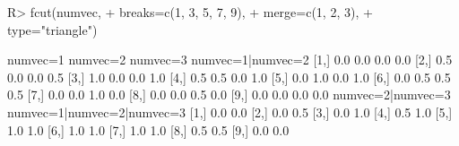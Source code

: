 \begin{Schunk}
% --begin: "fcut.merge2"
\begin{Sinput}
R> fcut(numvec,
+       breaks=c(1, 3, 5, 7, 9),
+       merge=c(1, 2, 3),
+       type="triangle")
\end{Sinput}
\begin{Soutput}
      numvec=1 numvec=2 numvec=3 numvec=1|numvec=2
 [1,]      0.0      0.0      0.0               0.0
 [2,]      0.5      0.0      0.0               0.5
 [3,]      1.0      0.0      0.0               1.0
 [4,]      0.5      0.5      0.0               1.0
 [5,]      0.0      1.0      0.0               1.0
 [6,]      0.0      0.5      0.5               0.5
 [7,]      0.0      0.0      1.0               0.0
 [8,]      0.0      0.0      0.5               0.0
 [9,]      0.0      0.0      0.0               0.0
      numvec=2|numvec=3 numvec=1|numvec=2|numvec=3
 [1,]               0.0                        0.0
 [2,]               0.0                        0.5
 [3,]               0.0                        1.0
 [4,]               0.5                        1.0
 [5,]               1.0                        1.0
 [6,]               1.0                        1.0
 [7,]               1.0                        1.0
 [8,]               0.5                        0.5
 [9,]               0.0                        0.0
\end{Soutput}
%
% --end: "fcut.merge2"
\end{Schunk}
